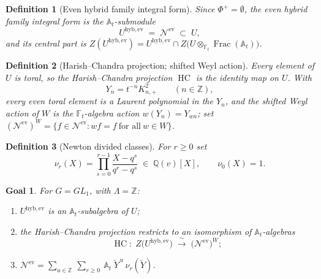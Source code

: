 \documentclass[11pt]{article}
\newtheorem{definition}{Definition}
\newtheorem*{goal}{Goal}
\newcommand{\At}{\mathbb{A}_t}
\newcommand{\Ft}{\mathbb{F}_t}
\newcommand{\Nev}{\mathcal N^{\mathrm{ev}}}
\newcommand{\Uev}{U^{\mathrm{hyb,ev}}}
\newcommand{\HC}{\operatorname{HC}}
\newcommand{\Yc}{\check Y}
\begin{document}
\begin{definition}[Even hybrid family integral form]\label{def:uev}
Since $\Phi^{+}=\emptyset$, the \emph{even hybrid family integral form} is the
$\At$-submodule
\[
  \Uev\;=\;\Nev\;\subset\;U,
\]
and its \emph{central part} is
$Z(\Uev)=\Uev\cap Z\bigl(U\otimes_{\Ft}\operatorname{Frac}(\At)\bigr)$.
\end{definition}

\begin{definition}[Harish--Chandra projection; shifted Weyl action]\label{def:hc}
Every element of $U$ is toral, so the \emph{Harish--Chandra projection} $\HC$ is
the identity map on $U$. With
\[
  Y_n=t^{-n}K_{n,+}^{2}\qquad(n\in\mathbb Z),
\]
every even toral element is a Laurent polynomial in the $Y_n$, and the
\emph{shifted Weyl action} of $W$ is the $\Ft$-algebra action
$w(Y_n)=Y_{wn}$; set $(\Nev)^{W}=\{f\in\Nev: wf=f\ \text{for all}\ w\in W\}$.
\end{definition}

\begin{definition}[Newton divided classes]\label{def:nu}
For $r\ge0$ set
\[
  \nu_{r}(X)=\prod_{s=0}^{r-1}\frac{X-q^{s}}{q^{r}-q^{s}}\;\in\;\mathbb Q(v)[X],
  \qquad \nu_0(X)=1 .
\]
\end{definition}

\begin{goal}\label{goal:main}
For $G=GL_1$, with $\Lambda=\mathbb Z$:
\begin{enumerate}
  \item[(i)] $\Uev$ is an $\At$-subalgebra of $U$;
  \item[(ii)] the Harish--Chandra projection restricts to an isomorphism of
  $\At$-algebras
  \[
    \HC:\;Z\bigl(\Uev\bigr)\;\xrightarrow{\ \sim\ }\;\bigl(\Nev\bigr)^{W};
  \]
  \item[(iii)] $\displaystyle
    \Nev=\sum_{u\in\mathbb Z}\ \sum_{r\ge0}\ \At\;\Yc^{\,u}\,\nu_{r}(\Yc)$.
\end{enumerate}
\end{goal}
\end{document}
